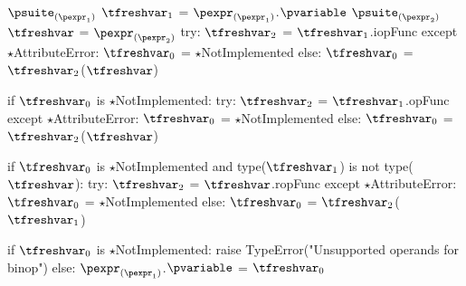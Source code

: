 \documentclass{article}
\begin{document}
\newsavebox{\augmentedAttributeAssignmentBox}
\begin{lrbox}{\augmentedAttributeAssignmentBox}
\begin{python}
$\psuite_{(\pexpr_1)}$
$\tfreshvar_1$ = $\pexpr_{(\pexpr_1)}$.$\pvariable$
$\psuite_{(\pexpr_2)}$
$\tfreshvar$ = $\pexpr_{(\pexpr_2)}$
try:
  $\tfreshvar_2$ = $\tfreshvar_1$.iopFunc
except $\star$AttributeError:
  $\tfreshvar_0$ = $\star$NotImplemented
else:
  $\tfreshvar_0$ = $\tfreshvar_2$($\tfreshvar$)

if $\tfreshvar_0$ is $\star$NotImplemented:
  try:
    $\tfreshvar_2$ = $\tfreshvar_1$.opFunc
  except $\star$AttributeError:
    $\tfreshvar_0$ = $\star$NotImplemented
  else:
    $\tfreshvar_0$ = $\tfreshvar_2$($\tfreshvar$)

if $\tfreshvar_0$ is $\star$NotImplemented and
  type($\tfreshvar_1$) is not type($\tfreshvar$):
  try:
    $\tfreshvar_2$ = $\tfreshvar$.ropFunc
  except $\star$AttributeError:
    $\tfreshvar_0$ = $\star$NotImplemented
  else:
    $\tfreshvar_0$ = $\tfreshvar_2$($\tfreshvar_1$)

if $\tfreshvar_0$ is $\star$NotImplemented:
  raise TypeError("Unsupported operands for binop")
else:
    $\pexpr_{(\pexpr_1)}$.$\pvariable$ = $\tfreshvar_0$
\end{python}
\end{lrbox}

\begin{mathpar}
\end{mathpar}
\end{document}

